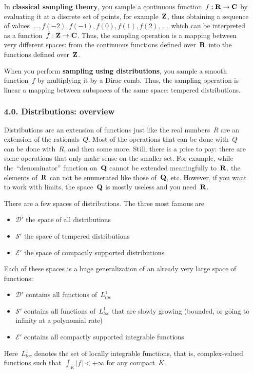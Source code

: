 In {\bf classical sampling theory}, you sample a continuous
function~$f:\mathbf{R}\to\mathbf{C}$ by evaluating it at a discrete set of points,
for example~$\mathbf{Z}$, thus obtaining a sequence of
values~$\ldots,f(-2),f(-1),f(0),f(1),f(2),\ldots$, which can be
interpreted as a function~$\tilde f:\mathbf{Z}\to\mathbf{C}$.  Thus, the sampling
operation is a mapping between very different spaces: from the
continuous functions defined over~$\mathbf{R}$ into the functions defined
over~$\mathbf{Z}$.

When you perform {\bf sampling using distributions}, you sample a
smooth function~$f$ by multiplying it by a Dirac comb.  Thus,
the sampling operation is linear a mapping between subspaces of the same
space: tempered distributions.

\subsubsection{4.0. Distributions: overview}

Distributions are an extension of functions just like the real
numbers~$R$ are an extension of the rationals~$Q$.  Most of the
operations that can be done with~$Q$ can be done with~$R$, and then
some more.  Still, there is a price to pay: there are some
operations that only make sense on the smaller set.  For example,
while the~``denominator'' function on~$\mathbf{Q}$ cannot be extended
meaningfully to~$\mathbf{R}$, the elements of~$\mathbf{R}$ can not be enumerated like
those of~$\mathbf{Q}$, etc.  However, if you want to work with limits, the
space~$\mathbf{Q}$ is mostly useless and you need~$\mathbf{R}$.

There are a few spaces of distributions.  The three most famous are
\begin{itemize}
	\item $\mathcal{D}'$ the space of all distributions
	\item $\mathcal{S}'$ the space of tempered distributions
	\item $\mathcal{E}'$ the space of compactly supported distributions
\end{itemize}

Each of these spaces is a huge generalization of an already very large
space of functions:
\begin{itemize}
	\item $\mathcal{D}'$ contains all functions of~$L^1_{loc}$
	\item $\mathcal{S}'$ contains all functions of~$L^1_{loc}$ that
		are slowly growing (bounded, or going to infinity at a polynomial
		rate)
	\item $\mathcal{E}'$ contains all compactly supported integrable
		functions
\end{itemize}
Here~$L^1_{loc}$ denotes the set of locally integrable functions,
that is, complex-valued functions such that~$\int_K|f| <+\infty$ for
any compact~$K$.


